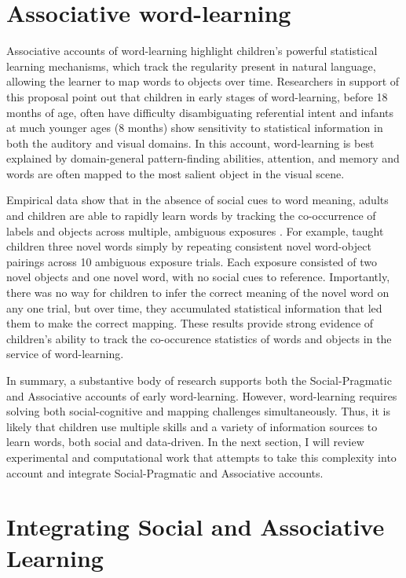 \documentclass[man]{apa2}
\begin{document}
\section{Associative word-learning}

Associative accounts of word-learning highlight children's powerful statistical learning mechanisms, which track the regularity present in natural language, allowing the learner to map words to objects over time. Researchers in support of this proposal point out that children in early stages of word-learning, before 18 months of age, often have difficulty disambiguating referential intent and infants at much younger ages (8 months) show sensitivity to statistical information in both the auditory \cite{saffran1996statistical} and visual \cite{fiser2002statistical} domains. In this account, word-learning is best explained by domain-general pattern-finding abilities, attention, and memory and words are often mapped to the most salient object in the visual scene.

Empirical data show that in the absence of social cues to word meaning, adults and children are able to rapidly learn words by tracking the co-occurrence of labels and objects across multiple, ambiguous exposures \cite{smith2008infants,vouloumanos2008fine}. For example,  taught children three novel words simply by repeating consistent novel word-object pairings across 10 ambiguous exposure trials. Each exposure consisted of two novel objects and one novel word, with no social cues to reference. Importantly, there was no way for children to infer the correct meaning of the novel word on any one trial, but over time, they accumulated statistical information that led them to make the correct mapping. These results provide strong evidence of children's ability to track the co-occurence statistics of words and objects in the service of word-learning. 

In summary, a substantive body of research supports both the Social-Pragmatic and Associative accounts of early word-learning. However, word-learning requires solving both social-cognitive and mapping challenges simultaneously. Thus, it is likely that children use multiple skills and a variety of information sources to learn words, both social and data-driven. In the next section, I will review experimental and computational work that attempts to take this complexity into account and integrate Social-Pragmatic and Associative accounts. 

\section{Integrating Social and Associative Learning}
\end{document}
